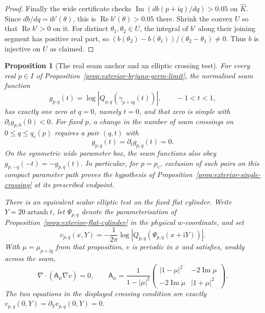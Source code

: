 \documentclass[11pt,a4paper]{article}
\newtheorem{proposition}[theorem]{Proposition}
\theoremstyle{definition}
\newcommand{\ii}{\mathrm{i}}
\begin{document}
\begin{proof}
Finally the wide certificate checks
$\operatorname{Im}(db(p+\ii q)/dq)>0.05$ on $\widehat K$.
Since $db/dq=\ii b'(\theta)$, this is
$\operatorname{Re}b'(\theta)>0.05$ there.  Shrink the convex $U$ so
that $\operatorname{Re}b'>0$ on it.  For distinct
$\theta_1,\theta_2\in U$, the integral of $b'$ along their joining
segment has positive real part, so
$(b(\theta_2)-b(\theta_1))/(\theta_2-\theta_1)\ne0$.
Thus $b$ is injective on $U$ as claimed.
\end{proof}

\begin{proposition}[The real seam anchor and an elliptic crossing test]
\label{prop:exterior-real-seam-anchor}
For every real $p\in I$ of
Proposition~\ref{prop:exterior-brjuno-germ-limit}, the normalised seam
function
\[
 g_{p,q}(t)=\log|Q_{p,q}(\gamma_{p+\ii q}(t))|,
 \qquad -1<t<1,
\]
has exactly one zero at $q=0$, namely $t=0$, and that zero is simple
with $\partial_tg_{p,0}(0)<0$.  For fixed $p$, a change in the number
of seam crossings on $0\le q\le q_c(p)$ requires a pair $(q,t)$
with
\[
 g_{p,q}(t)=\partial_tg_{p,q}(t)=0.
\]
On the symmetric wide parameter box, the seam functions also obey
$g_{p,-q}(-t)=-g_{p,q}(t)$.
In particular, for $p=p_c$, exclusion of such pairs on this compact
parameter path proves the hypothesis of
Proposition~\ref{prop:exterior-single-crossing} at its prescribed
endpoint.

There is an equivalent scalar elliptic test on the fixed flat
cylinder.  Write $Y=20\operatorname{artanh}t$, let $\Psi_{p,q}$
denote the parameterisation of
Proposition~\ref{prop:exterior-flat-cylinder} in the physical
$w$-coordinate, and set
\[
 v_{p,q}(x,Y)=-\frac{1}{2\pi}
  \log|Q_{p,q}(\Psi_{p,q}(x+\ii Y))|.
\]
With $\mu=\mu_{p+\ii q}$ from that proposition, $v$ is periodic in
$x$ and satisfies, weakly across the seam,
\[
 \nabla\!\cdot(\mathsf A_\mu\nabla v)=0,\qquad
 \mathsf A_\mu=
 \frac1{1-|\mu|^2}
 \begin{pmatrix}
 |1-\mu|^2&-2\operatorname{Im}\mu\\
 -2\operatorname{Im}\mu&|1+\mu|^2
 \end{pmatrix}.
\]
The two equations in the displayed crossing condition are exactly
$v_{p,q}(0,Y)=\partial_Yv_{p,q}(0,Y)=0$.
\end{proposition}
\end{document}
